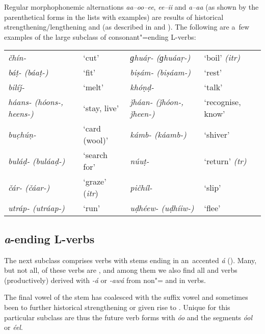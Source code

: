 Regular morphophonemic alternations \textit{aa--oo--ee}, \textit{ee--ii} and \textit{a--aa} (as shown by the parenthetical forms in the lists with examples) are results of historical strengthening/lengthening and  (as described in  and ). The following are a~few examples of the large subclass of consonant"=ending L-verbs: 


\begin{table}[H]
\begin{tabularx}{\textwidth}{ Q Q Q Q }
\textit{čhín-} &
`cut' &
\textit{ɡhuáṛ- (ɡhuáaṛ-)} &
`boil' \textit{(itr)}\\
\textit{báṭ- (báaṭ-)} &
`fit' &
\textit{biṣám- (biṣáam-)} &
`rest'\\
\textit{bilíǰ-} &
`melt' &
\textit{khóṇḍ-} &
`talk'\\
\textit{háans- (hóons-, heens-)} &
`stay, live'
&
\textit{ǰháan- (ǰhóon-, ǰheen-)} &
`recognise, know'\\
\textit{buc̣húṇ-} &
`card (wool)' &
\textit{kámb- (káamb-)} &
`shiver'\\
\textit{buláḍ- (buláaḍ-)} &
`search for' &
\textit{núuṭ-} &
`return' \textit{(tr)}\\
\textit{čár- (čáar-)} &
`graze' (\textit{itr}) &
\textit{pičhíl-} &
`slip'\\
\textit{utráp- (utráap-)} &
`run' &
\textit{uḍhéew- (uḍhíiw-)} &
`flee'\\
\end{tabularx}
\end{table}


\subsection{\textit{a}-ending L-verbs}
\label{subsec:8-3-2}


The next subclass comprises verbs with stems ending in an~accented \textit{á} (). Many, but not all, of these verbs are , and among them we also find all  and  verbs (productively) derived with \textit{-á} or \textit{-awá} from non"= and in verbs.


The final vowel of the stem has coalesced with the suffix vowel and sometimes been  to further historical strengthening or given rise to . Unique for this particular subclass are thus the future verb forms with \textit{óo} and the  segments \textit{óol} or \textit{éel}. 


